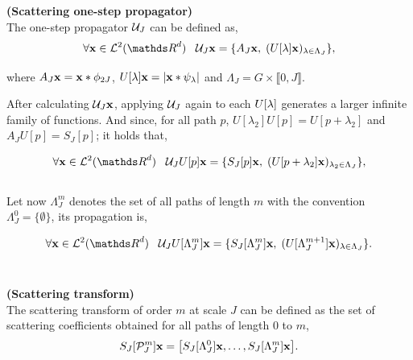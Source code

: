 \documentclass[a4paper,11pt]{report}
\begin{document}
			\begin{defn}  \textbf{(Scattering one-step propagator)}\\
				The one-step propagator $\mathcal{U}_{J}$ can be defined as,
				\begin{equation}
					\forall \bfx \in \mcalL^{2}(\dsR^{d}) \;\;\;
					\mcalU_{J} \bfx = \{ A_{J}\bfx , \; (U[\lambda]\bfx)_{\lambda \in \Lambda_{J}} \},
					\label{eq:One step propagator}
				\end{equation}
				
				where $A_{J}{\bf x} = {\bf x} \ast \phi_{2J}$, $U[\lambda]{\bf x} = \left| {\bf x} \ast \psi_{\lambda} \right|$ and $\Lambda_{J} = G \times \llbracket0, J \rrbracket$.\\
				\label{def:One step propagator}
			\end{defn}
			
			After calculating $\mathcal{U}_{J}{\bf x}$, applying $\mathcal{U}_{J}$ again to each $U[\lambda]\bf$ generates a larger infinite family of functions. And since, for all path $p$, $U[\lambda_{2}]U[p] = U[p+\lambda_{2}]$ and $ A_{J}U[p] = S_{J}[p]$; it holds that,
			
			\begin{equation}
					\forall \bfx \in \mcalL^{2}(\dsR^{d}) \;\;\; \mcalU_{J}U[p] \bfx = \{ S_{J}[p]\bfx , \; (U[p+\lambda_{2}]\bfx)_{\lambda_{2} \in \Lambda_{J}} \},
					\label{eq:SCN propagation 1}
			\end{equation}\\
			
			Let now $\Lambda_{J}^{m}$ denotes the set of all paths of length $m$ with the convention $\Lambda_{J}^{0} = \{ \emptyset \}$, its propagation is,
			
			\begin{equation}
					\forall \bfx \in \mcalL^{2}(\dsR^{d}) \;\;\; \mcalU_{J}U[\Lambda_{J}^{m}] \bfx = \{ S_{J}[\Lambda_{J}^{m}]\bfx , \; (U[\Lambda_{J}^{m+1}]\bfx)_{\lambda \in \Lambda_{J}} \}.
					\label{eq:SCN propagation 2}
			\end{equation}\\
			
			\begin{defn}  \textbf{(Scattering transform)}\\			  
			  The scattering transform of order $m$ at scale $J$ can be defined as the set of scattering coefficients obtained for all paths of length $0$ to $m$,
			  \begin{equation}
			    S_{J}[\mathcal{P}_{J}^{m}]{\bf x} = \big[S_{J}[\Lambda_{J}^{0}]{\bf x} , \dots , S_{J}[\Lambda_{J}^{m}]{\bf x} \big].\\
					\label{eq:scattering transform}
			  \end{equation}\\ 
			\end{defn}
			
\end{document}
